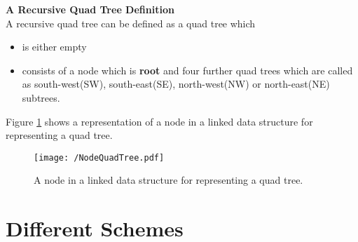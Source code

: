 		\textbf{A Recursive Quad Tree Definition}\\
		A recursive quad tree can be defined as a quad tree which
		\begin{itemize}
			\item is either empty
			\item consists of a node which is \textbf{root} and four further quad trees which are called as south-west(SW), south-east(SE), north-west(NW) or north-east(NE) subtrees. 
		\end{itemize}
		 
		 Figure \ref{fig:NodeQuadTree} shows a representation of a node in a linked data structure for representing a quad tree.
		 		
		 \begin{figure}[h]
		 	\centering
		 	\texttt{[image: /NodeQuadTree.pdf]}
		 	\caption{A node in a linked data structure for representing a quad tree.}
		 	\label{fig:NodeQuadTree}
		 \end{figure}

 
 \section{Different Schemes}
 


